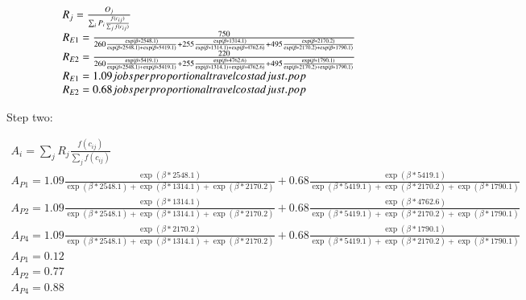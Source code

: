 \documentclass[]{elsarticle} %
\begin{document}
\begin{equation}
\begin{array}{l}

R_{j} = \frac{O_{j}}{\sum_i P_{i} \frac{f(c_{ij})}{\sum_j f(c_{ij})}}\\

R_{E1} = \frac{750}{260 \frac{\exp(\beta *2548.1)}{\exp(\beta *2548.1) + \exp(\beta *5419.1)} + 255 \frac{\exp(\beta *1314.1)}{\exp(\beta *1314.1) + \exp(\beta *4762.6)} + 495 \frac{\exp(\beta *2170.2)}{\exp(\beta *2170.2) + \exp(\beta *1790.1)}}\\
R_{E2} = \frac{220}{260 \frac{\exp(\beta*5419.1)}{\exp(\beta *2548.1) + \exp(\beta *5419.1)} + 255 \frac{\exp(\beta*4762.6)}{\exp(\beta*1314.1) + \exp(\beta *4762.6)} + 495\frac{\exp(\beta*1790.1)}{\exp(\beta *2170.2) + \exp(\beta *1790.1)}}\\

R_{E1} = 1.09 \space jobs \space per \space proportional \space travel \space cost \space adjust. \space pop\\
R_{E2} = 0.68 \space jobs \space per \space proportional \space travel \space cost \space adjust. \space pop\\
\end{array}
\end{equation}

Step two:

\begin{equation}
\begin{array}{l}
A_{i} = {\sum_j R_{j}\frac{f(c_{ij})}{\sum_j f(c_{ij})}}\\A_{P1} = 1.09\frac{\exp(\beta*2548.1)}{\exp(\beta *2548.1) + \exp(\beta *1314.1) + \exp(\beta *2170.2)} + 0.68 \frac{\exp(\beta*5419.1)}{\exp(\beta *5419.1) + \exp(\beta *2170.2) + \exp(\beta *1790.1)} \\
A_{P2} = 1.09\frac{\exp(\beta *1314.1)}{\exp(\beta *2548.1) + \exp(\beta *1314.1) + \exp(\beta *2170.2)} + 0.68 \frac{\exp(\beta *4762.6)}{\exp(\beta *5419.1) + \exp(\beta *2170.2) + \exp(\beta *1790.1)} \\
A_{P4} = 1.09 \frac{\exp(\beta *2170.2)}{\exp(\beta *2548.1) + \exp(\beta *1314.1) + \exp(\beta *2170.2)} + 0.68 \frac{\exp(\beta *1790.1)}{\exp(\beta *5419.1) + \exp(\beta *2170.2) + \exp(\beta *1790.1)} \\
A_{P1} = 0.12 \\
A_{P2} = 0.77 \\
A_{P4} = 0.88 \\
\end{array}
\end{equation}
\end{document}
